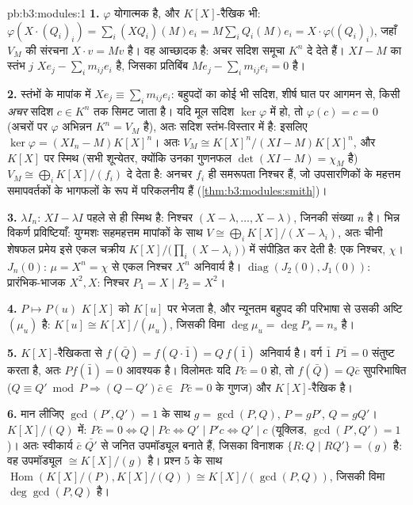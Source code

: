 \begin{solution}{pb:b3:modules:1}
\textbf{1.} $\varphi$ योगात्मक है, और $K[X]$-रैखिक भी: $\varphi(X
\cdot (Q_i)_i) = \sum_i (XQ_i)(M)e_i = M\sum_i Q_i(M)e_i = X
\cdot \varphi\bigl((Q_i)_i\bigr)$, जहाँ $V_M$
की  संरचना $X \cdot v = Mv$ है। वह आच्छादक है: अचर सदिश समूचा $K^n$ दे
देते हैं। $XI - M$ का स्तंभ $j$ $Xe_j - \sum_i
m_{ij}e_i$ है, जिसका प्रतिबिंब $Me_j - \sum_i m_{ij}e_i = 0$ है।

\textbf{2.} स्तंभों के मापांक में $Xe_j \equiv \sum_i m_{ij}e_i$: बहुपदों का कोई भी सदिश,
शीर्ष घात पर आगमन से, किसी \emph{अचर} सदिश $c \in K^n$ तक सिमट जाता है।
यदि मूल सदिश $\ker\varphi$ में हो, तो $\varphi(c) = c = 0$ (अचरों पर $\varphi$ अभिन्नन $K^n = V_M$
है), अतः सदिश स्तंभ-विस्तार में है: इसलिए $\ker\varphi = (XI_n -
M)K[X]^n$। अतः $V_M \cong K[X]^n/(XI - M)K[X]^n$, और $K[X]$
पर स्मिथ (सभी  शून्येतर, क्योंकि उनका गुणनफल $\det(XI - M) = \chi_M$
है) $V_M \cong \bigoplus_i
K[X]/(f_i)$ दे देता है: अनचर $f_i$ ही समरूपता निश्चर हैं, जो उपसारणिकों
के महत्तम समापवर्तकों के भागफलों के रूप में परिकलनीय हैं (\cref{thm:b3:modules:smith})।

\textbf{3.} $\lambda I_n$: $XI - \lambda I$ पहले से ही स्मिथ है: निश्चर $(X - \lambda, \dots, X - \lambda)$, जिनकी
संख्या $n$ है। भिन्न विकर्ण प्रविष्टियाँ: युग्मशः सहमहत्तम मापांकों
के साथ $V \cong \bigoplus_i K[X]/(X -
\lambda_i)$, अतः चीनी शेषफल प्रमेय इसे एकल चक्रीय $K[X]/\bigl(\prod_i(X - \lambda_i)\bigr)$ में संपीड़ित
कर देती है: एक निश्चर, $\chi$। $J_n(0)$: $\mu = X^n = \chi$ से एकल निश्चर $X^n$
अनिवार्य है। $\operatorname{diag}(J_2(0), J_1(0))$: प्रारंभिक-भाजक $X^2, X$: निश्चर $P_1 = X \mid P_2 =
X^2$।

\textbf{4.} $P \mapsto P(u)$ $K[X]$ को $K[u]$ पर भेजता है, और न्यूनतम बहुपद की
परिभाषा से उसकी अष्टि $(\mu_u)$ है: $K[u]
\cong K[X]/(\mu_u)$, जिसकी विमा $\deg\mu_u = \deg P_s = n_s$ है।

\textbf{5.} $K[X]$-रैखिकता से $f(\bar Q) = f(Q\cdot\bar 1)
= Q\,f(\bar 1)$ अनिवार्य है। वर्ग $\bar 1$ $P \bar 1 = 0$
संतुष्ट करता है, अतः $P f(\bar 1) = 0$ आवश्यक है। विलोमतः यदि $P\bar c = 0$ हो, तो $f(\bar Q) = Q\bar c$
सुपरिभाषित ($Q \equiv Q' \bmod P
\Rightarrow (Q - Q')\bar c \in$ $P\bar c = 0$ के गुणज) और $K[X]$-रैखिक है।

\textbf{6.} मान लीजिए $\gcd(P', Q') = 1$ के साथ $g = \gcd(P, Q)$, $P = gP'$, $Q = gQ'$। $K[X]/(Q)$ में:
$P\bar c = 0 \iff Q \mid Pc
\iff Q' \mid P'c \iff Q' \mid c$ (यूक्लिड, $\gcd(P', Q') = 1$)। अतः स्वीकार्य $\bar c$ $\bar{Q'}$ से जनित उपमॉड्यूल
बनाते हैं, जिसका विनाशक $\{R : Q \mid RQ'\} = (g)$ है: वह उपमॉड्यूल $\cong K[X]/(g)$ है। प्रश्न 5
के साथ $\operatorname{Hom}(K[X]/(P), K[X]/(Q)) \cong K[X]/(\gcd(P,Q))$, जिसकी विमा $\deg\gcd(P,Q)$ है।


\end{solution}
